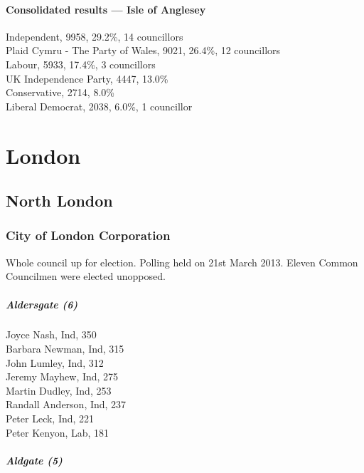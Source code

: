 \documentclass[a4paper,openany,10pt]{book}
\begin{document}
\subsection*{Consolidated results --- Isle of Anglesey}
Independent, 9958, 29.2\%, 14 councillors\\
Plaid Cymru - The Party of Wales, 9021, 26.4\%, 12 councillors\\
Labour, 5933, 17.4\%, 3 councillors\\
UK Independence Party, 4447, 13.0\% \\
Conservative, 2714, 8.0\% \\
Liberal Democrat, 2038, 6.0\%, 1 councillor\\


\part{London}

\chapter{North London}

\section{City of London Corporation}

Whole council up for election. Polling held on 21st March 2013. Eleven Common Councilmen were elected unopposed.



\subsubsection*{Aldersgate (6)}



Joyce Nash, Ind, 350\\
Barbara Newman, Ind, 315\\
John Lumley, Ind, 312\\
Jeremy Mayhew, Ind, 275\\
Martin Dudley, Ind, 253\\
Randall Anderson, Ind, 237\\
Peter Leck, Ind, 221\\
Peter Kenyon, Lab, 181\\


\subsubsection*{Aldgate (5)}
\end{document}
